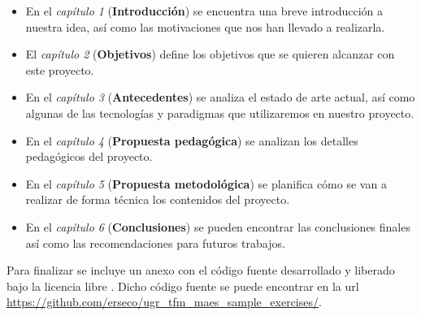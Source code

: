 \begin{itemize}
  \item En el \textit{capítulo 1} (\textbf{Introducción}) se encuentra una breve introducción a nuestra idea, así como las motivaciones que nos han llevado a realizarla.
  \item El \textit{capítulo 2} (\textbf{Objetivos}) define los objetivos que se quieren alcanzar con este proyecto.
  \item En el \textit{capítulo 3} (\textbf{Antecedentes}) se analiza el estado de arte actual, así como algunas de las tecnologías y paradigmas que utilizaremos en nuestro proyecto.
  \item En el \textit{capítulo 4} (\textbf{Propuesta pedagógica}) se analizan los detalles pedagógicos del proyecto.
  \item En el \textit{capítulo 5} (\textbf{Propuesta metodológica}) se planifica cómo se van a realizar de forma técnica los contenidos del proyecto.
  \item En el \textit{capítulo 6} (\textbf{Conclusiones}) se pueden encontrar las conclusiones finales así como las recomendaciones para futuros trabajos.

\end{itemize}


\bigskip
Para finalizar se incluye un anexo con el código fuente desarrollado y liberado bajo la licencia libre \cite{gplv3}. Dicho código fuente se puede encontrar en la url \url{https://github.com/erseco/ugr_tfm_maes_sample_exercises/}.








